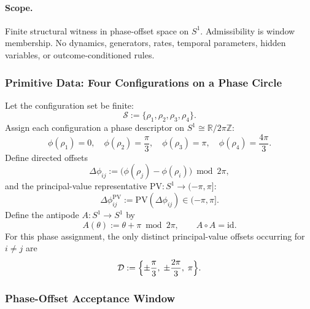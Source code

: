 \documentclass[aps,prx,onecolumn,11pt]{revtex4-2}
\theoremstyle{plain}
\theoremstyle{definition}
\theoremstyle{remark}
\begin{document}
\paragraph{Scope.}
Finite structural witness in phase-offset space on $S^1$. Admissibility
is window membership. No dynamics, generators, rates, temporal
parameters, hidden variables, or outcome-conditioned rules.

\subsubsection{Primitive Data: Four Configurations on a Phase Circle}
\label{subsubsec:toy_phasecircle_data}

Let the configuration set be finite:
\begin{equation}
\mathcal{S} := \{\rho_1, \rho_2, \rho_3, \rho_4\}.
\label{eq:toy_phasecircle_states}
\end{equation}
Assign each configuration a phase descriptor on
$S^1 \cong \mathbb{R}/2\pi\mathbb{Z}$:
\begin{equation}
\phi(\rho_1) = 0, \quad
\phi(\rho_2) = \frac{\pi}{3}, \quad
\phi(\rho_3) = \pi, \quad
\phi(\rho_4) = \frac{4\pi}{3}.
\label{eq:toy_phasecircle_phases}
\end{equation}
Define directed offsets
\begin{equation}
\Delta\phi_{ij} :=
\bigl(\phi(\rho_j) - \phi(\rho_i)\bigr) \bmod 2\pi,
\label{eq:toy_phasecircle_offsets}
\end{equation}
and the principal-value representative
$\mathrm{PV} : S^1 \to (-\pi,\pi]$:
\begin{equation}
\Delta\phi_{ij}^{\mathrm{PV}} :=
\mathrm{PV}(\Delta\phi_{ij}) \in (-\pi,\pi].
\label{eq:toy_phasecircle_pv}
\end{equation}
Define the antipode $A : S^1 \to S^1$ by
\begin{equation}
A(\theta) := \theta + \pi \bmod 2\pi,
\qquad A \circ A = \mathrm{id}.
\label{eq:toy_phasecircle_antipode}
\end{equation}
For this phase assignment, the only distinct principal-value offsets
occurring for $i \neq j$ are
\begin{equation}
\mathcal{D} :=
\Bigl\{\pm\frac{\pi}{3},\; \pm\frac{2\pi}{3},\; \pi\Bigr\}.
\label{eq:toy_phasecircle_discrete_offsets}
\end{equation}

\subsubsection{Phase-Offset Acceptance Window}
\label{subsubsec:toy_phasecircle_window}
\end{document}
